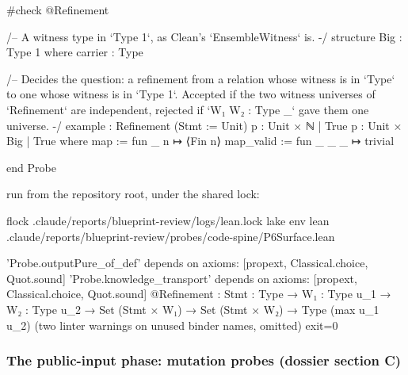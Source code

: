 \begin{leancode}
#check @Refinement

/-- A witness type in `Type 1`, as Clean's `EnsembleWitness` is. -/
structure Big : Type 1 where
  carrier : Type

/-- Decides the question: a refinement from a relation whose witness is in `Type` to one whose
witness is in `Type 1`. Accepted if the two witness universes of `Refinement` are independent,
rejected if `{W₁ W₂ : Type _}` gave them one universe. -/
example : Refinement (Stmt := Unit) {p : Unit × ℕ | True} {p : Unit × Big | True} where
  map := fun _ n ↦ ⟨Fin n⟩
  map_valid := fun _ _ _ ↦ trivial

end Probe
\end{leancode}

run from the repository root, under the shared lock:

\begin{shellcode}
flock .claude/reports/blueprint-review/logs/lean.lock lake env lean .claude/reports/blueprint-review/probes/code-spine/P6Surface.lean
\end{shellcode}


\begin{srccode}
'Probe.outputPure_of_def' depends on axioms: [propext, Classical.choice, Quot.sound]
'Probe.knowledge_transport' depends on axioms: [propext, Classical.choice, Quot.sound]
@Refinement : {Stmt : Type} → {W₁ : Type u_1} → {W₂ : Type u_2} → Set (Stmt × W₁) → Set (Stmt × W₂) → Type (max u_1 u_2)
(two linter warnings on unused binder names, omitted)
exit=0
\end{srccode}

\subsubsection{The public-input phase: mutation probes (dossier section C)}\label{sec:gen-probes-pubinput}

\par{}\par

